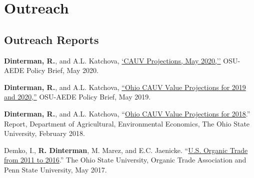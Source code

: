 \documentclass[letterpaper]{article}
\renewenvironment{itemize}{
  \begin{list}{}{
    \setlength{\leftmargin}{1.5em}
  }
}{
  \end{list}
}
\begin{document}
\section*{Outreach}

\subsection*{Outreach Reports}

\begin{itemize}
\item \textbf{Dinterman, R.}, and A.L. Katchova, \href{https://aede.osu.edu/about-us/publications/cauv-projections-may-2020}{`CAUV Projections, May 2020,''} OSU-AEDE Policy Brief, May 2020.
\item \textbf{Dinterman, R.}, and A.L. Katchova, \href{https://aede.osu.edu/sites/aede/files/publication_files/CAUVProjectionsReport2019.pdf}{``Ohio CAUV Value Projections for 2019 and 2020,''} OSU-AEDE Policy Brief, May 2019.
\item \textbf{Dinterman, R.}, and A.L. Katchova, ``\href{https://aede.osu.edu/sites/aede/files/publication_files/2018CAUVProjectionsReport.pdf}{Ohio CAUV Value Projections for 2018}.'' Report, Department of Agricultural, Environmental Economics, The Ohio State University, February 2018.
\item Demko, I., \textbf{R. Dinterman}, M. Marez, and E.C. Jaenicke. ``\href{https://ota.com/sites/default/files/indexed_files/OTATradeReport_10-30-2017.pdf}{U.S. Organic Trade from 2011 to 2016}.'' The Ohio State University, Organic Trade Association and Penn State University, May 2017.
\end{itemize}

% 
\end{document}
